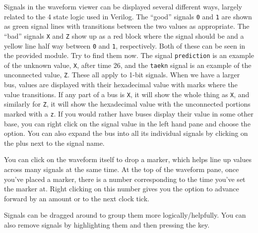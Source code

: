 \documentclass[dvipsnames]{article}
\begin{document}
Signals in the waveform viewer can be displayed several different ways, largely
related to the 4 state logic used in Verilog. The ``good'' signals \texttt{0}
and \texttt{1} are shown as green signal lines with transitions between the two
values as appropriate. The ``bad'' signals \texttt{X} and \texttt{Z} show up as
a red block where the signal should be and a yellow line half way between
\texttt{0} and \texttt{1}, respectively. Both of these can be seen in the
provided module. Try to find them now. The signal \texttt{prediction} is an
example of the unknown value, \texttt{X}, after time 26, and the \texttt{taekn} 
signal is an example of the unconnected value, \texttt{Z}. These all apply to
1-bit signals. When we have a larger bus, values are displayed with their
hexadecimal value with marks where the value transitions. If any part of a bus
is \texttt{X}, it will show the whole thing as \texttt{X}, and similarly for
\texttt{Z}, it will show the hexadecimal value with the unconnected portions
marked with a \texttt{z}. If you would rather have buses display their value in
some other base, you can right click on the signal value in the left hand pane
and choose the  option. You can also expand the bus into all its
individual signals by clicking on the plus next to the signal name.

You can click on the waveform itself to drop a marker, which helps line up 
values across many signals at the same time. At the top of the waveform pane,
once you've placed a marker, there is a number corresponding to the time you've
set the marker at. Right clicking on this number gives you the option to advance
forward by an amount or to the next clock tick. 

Signals can be dragged around to group them more logically/helpfully. You can
also remove signals by highlighting them and then pressing the 
key.
\end{document}
